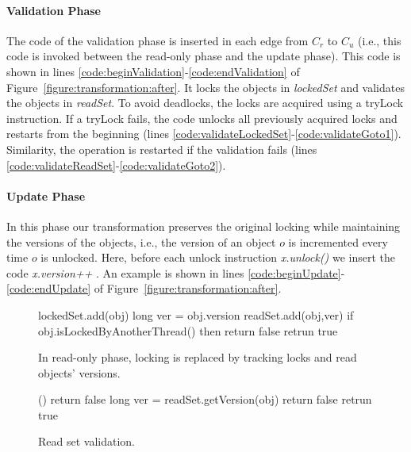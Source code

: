 \paragraph{Validation Phase}
The code of the validation phase is inserted in each edge from $C_r$ to $C_u$ (i.e., this code is invoked between the read-only phase and the update phase).
This code is shown in lines \ref{code:beginValidation}-\ref{code:endValidation} of Figure~\ref{figure:transformation:after}.
It locks the objects in \emph{lockedSet} and validates the objects in \emph{readSet}.
To avoid deadlocks, the locks are acquired using a tryLock
instruction.
If a tryLock fails, the code unlocks  all
previously acquired locks and restarts from the beginning
(lines \ref{code:validateLockedSet}-\ref{code:validateGoto1}).
Similarity, the operation is restarted if the validation fails (lines \ref{code:validateReadSet}-\ref{code:validateGoto2}).

\paragraph{Update Phase}
In this phase our transformation preserves the original locking while maintaining the versions of the objects, i.e., the version of an object $o$ is incremented every time $o$ is unlocked.
Here, before each unlock instruction \emph{\ttfamily x.unlock()} we insert the code \emph{\ttfamily x.version++} .
An example is shown in lines \ref{code:beginUpdate}-\ref{code:endUpdate} of Figure~\ref{figure:transformation:after}.


\begin{figure}
\scriptsize
\begin{algorithmic}[1]{}
		{\ttfamily
		\State lockedSet.add(obj) \label{code:lockedSet:add}
			\State long ver = obj.version \label{code:track:getVersion}
			\State readSet.add(obj,ver)
			\State if {obj.isLockedByAnotherThread()} then return false \label{code:track:returnFalse}
			\State retrun true
		\EndFunction
		}
\end{algorithmic}
\caption{In read-only phase, locking is replaced by
tracking locks and read
objects' versions.
\label{figure::track}}
\end{figure}




\begin{figure}
\scriptsize
\begin{algorithmic}[1]{}
		{\ttfamily
		()
			\State return false 
			\EndIf
			\State long ver = readSet.getVersion(obj)
				\State return false 
			\EndIf
		\EndFor
		\State retrun true 
		\EndFunction
		}
\end{algorithmic}
\caption{Read set validation.\label{figure::validate}}
\end{figure}


